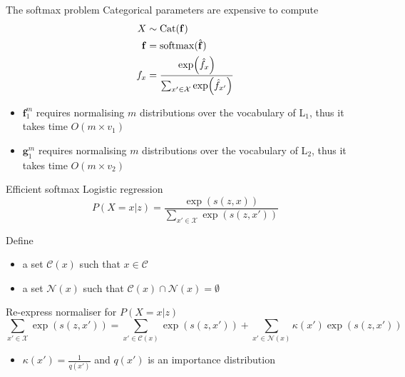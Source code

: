 \begin{frame}{The softmax problem}
Categorical parameters are expensive to compute 
\begin{equation*}
\begin{aligned}
X &\sim \operatorname{Cat}(\mathbf f)\\
\mathbf f &= \operatorname{softmax} (\hat{\mathbf f}) \\
f_{x} &= \frac{\exp(\hat f_x)}{\sum_{x' \in \mathcal X} \exp(\hat f_{x'})}
\end{aligned}
\end{equation*}

\pause

\begin{itemize}
	\item $\mathbf f_1^m$ requires normalising $m$ distributions over the vocabulary of L$_1$, thus it takes time $O(m \times v_1)$
	\item $\mathbf g_1^m$ requires normalising $m$ distributions over the vocabulary of L$_2$, thus it takes time $O(m \times v_2)$
\end{itemize}


\end{frame}

\begin{frame}{Efficient softmax}
Logistic regression
\begin{equation*}
P(X=x|z) = \frac{\exp(s(z, x))}{\sum_{x'\in \mathcal X} \exp(s(z, x'))}
\end{equation*}

\pause

Define
\begin{itemize}
	\item a set $\mathcal C(x)$ such that $x \in \mathcal C$
	\item a set $\mathcal N(x)$ such that $\mathcal C(x) \cap \mathcal N(x) = \emptyset$
\end{itemize}

\pause 
Re-express normaliser for $P(X=x|z)$ 
\begin{equation*}
\sum_{x'\in \mathcal X} \exp(s(z, x')) = \sum_{x'\in \mathcal C(x)} \exp(s(z, x')) + \sum_{x'\in \mathcal N(x)} \kappa(x')\exp(s(z, x'))
\end{equation*}
\begin{itemize}
	\item $\kappa(x') = \frac{1}{q(x')}$ and $q(x')$ is an importance distribution
\end{itemize}

\end{frame}

